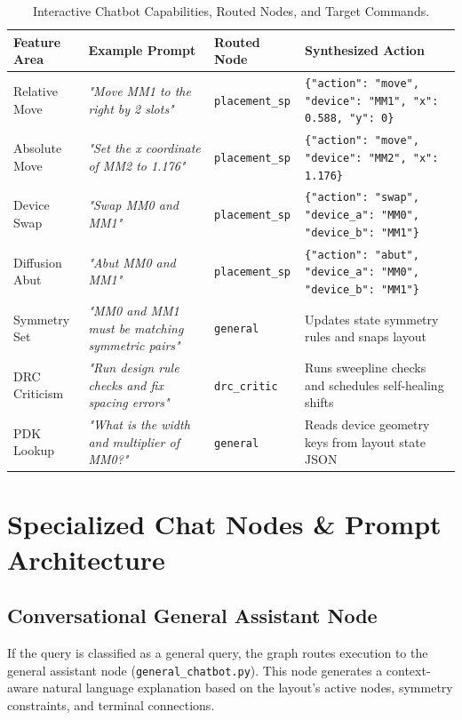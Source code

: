 \begin{table}[htbp]
    \centering
    \caption{Interactive Chatbot Capabilities, Routed Nodes, and Target Commands.}
    \label{tab:chatbot_capabilities}
    \begin{tabularx}{\textwidth}{l X l X}
        \toprule
        \textbf{Feature Area} & \textbf{Example Prompt} & \textbf{Routed Node} & \textbf{Synthesized Action} \\
        \midrule
        Relative Move & \textit{"Move MM1 to the right by 2 slots"} & \texttt{placement\_sp} & \texttt{\{"action": "move", "device": "MM1", "x": 0.588, "y": 0\}} \\
        Absolute Move & \textit{"Set the x coordinate of MM2 to 1.176"} & \texttt{placement\_sp} & \texttt{\{"action": "move", "device": "MM2", "x": 1.176\}} \\
        Device Swap & \textit{"Swap MM0 and MM1"} & \texttt{placement\_sp} & \texttt{\{"action": "swap", "device\_a": "MM0", "device\_b": "MM1"\}} \\
        Diffusion Abut & \textit{"Abut MM0 and MM1"} & \texttt{placement\_sp} & \texttt{\{"action": "abut", "device\_a": "MM0", "device\_b": "MM1"\}} \\
        Symmetry Set & \textit{"MM0 and MM1 must be matching symmetric pairs"} & \texttt{general} & Updates state symmetry rules and snaps layout \\
        DRC Criticism & \textit{"Run design rule checks and fix spacing errors"} & \texttt{drc\_critic} & Runs sweepline checks and schedules self-healing shifts \\
        PDK Lookup & \textit{"What is the width and multiplier of MM0?"} & \texttt{general} & Reads device geometry keys from layout state JSON \\
        \bottomrule
    \end{tabularx}
\end{table}

\section[Specialized Chat Nodes]{Specialized Chat Nodes \& Prompt Architecture}
\label{sec:chat_nodes}

\subsection{Conversational General Assistant Node}
If the query is classified as a general query, the graph routes execution to the general assistant node (\texttt{general\_}\allowbreak\texttt{chatbot.py}). This node generates a context-aware natural language explanation based on the layout's active nodes, symmetry constraints, and terminal connections.

